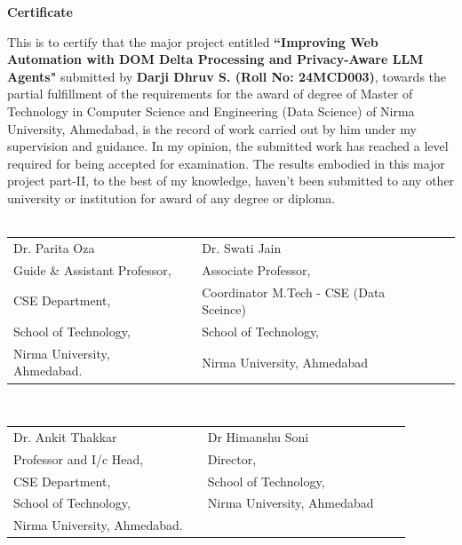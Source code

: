 \newpage
\vspace{4cm}
\begin{center}
{\Large \bf Certificate}\\
\end{center}
\vspace{10pt}

\noindent This is to certify that the major project entitled
 \textbf{``Improving Web Automation with DOM Delta Processing and Privacy-Aware LLM Agents"} submitted by \textbf{Darji Dhruv S. (Roll No: 24MCD003)}, towards the partial fulfillment of the requirements for the award of degree of Master of Technology in Computer Science and Engineering (Data Science) of Nirma University, Ahmedabad, is the record of work carried out by him under my supervision and guidance. In my opinion, the submitted work has reached a level required for being accepted for examination. The results embodied in this major project part-II, to the best of my knowledge, haven't been submitted to any other university or institution for award of any degree or diploma. \\
\vspace{2cm} \\
\noindent


\vspace{2cm} \noindent
\begin{tabular}{ l p{3.1cm}lp{4cm}l }
Dr. Parita Oza 					& \hspace{0.3cm} 		& Dr.  Swati Jain\\
Guide \& Assistant Professor, 	& 						   & Associate Professor, \\
CSE Department, 				& 						& Coordinator M.Tech - CSE (Data Sceince)\\
School of Technology, 		& 						& School of Technology,\\
Nirma University, Ahmedabad. 	& 						& Nirma University, Ahmedabad\\
\end{tabular} \\



\vspace{2cm} \noindent
\begin{tabular}{ l p{3.1cm}lp{4cm}l }
Dr. Ankit Thakkar 			& \hspace{0.3cm} 		& Dr Himanshu Soni\\
Professor and I/c Head, 			& 						& Director, \\
CSE Department, 				& 						& School of Technology,\\
School of Technology, 		& 						& Nirma University, Ahmedabad\\
Nirma University, Ahmedabad. 	& 						& \\
\end{tabular} \\



